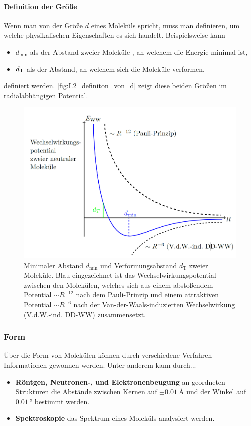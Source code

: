     \paragraph{Definition der Größe} Wenn man von der Größe $d$ eines Moleküls spricht, muss man definieren, um welche physikalischen Eigenschaften es sich handelt. Beispielsweise kann \begin{itemize}
        \item $d_\text{min}$ als der Abstand zweier Moleküle , an welchem die Energie minimal ist,
        \item $d_\text T$ als der Abstand, an welchem sich die Moleküle verformen,
    \end{itemize} 
    definiert werden. \autoref{fig:I.2_definiton_von_d} zeigt diese beiden Größen im radialabhängigen Potential. 
    
    \begin{figure}[H]
        \centering
        \includegraphics[width=0.8\linewidth]{figures/vl01/definition_von_d.png}
        \caption{Minimaler Abstand $d_\text{min}$ und Verformungsabstand $d_\text{T}$ zweier Moleküle. Blau eingezeichnet ist das Wechselwirkungspotential zwischen den Molekülen, welches sich aus einem abstoßendem Potential $\sim R^{-12}$ nach dem Pauli-Prinzip und einem attraktiven Potential $\sim R^{-6}$ nach der Van-der-Waals-induzierten Wechselwirkung (V.d.W.-ind. DD-WW) zusammensetzt.}
        \label{fig:I.2_definiton_von_d}
    \end{figure}
    
    
    \subsubsection{Form}
        Über die Form von Molekülen können durch verschiedene Verfahren Informationen gewonnen werden. Unter anderem kann durch...
        \begin{itemize}
        	\item \textbf{Röntgen, Neutronen-, und Elektronenbeugung} an geordneten Strukturen die Abstände zwischen Kernen auf $\pm\SI{0,01}{\angstrom}$ und der Winkel auf $\SI{0,01}{\degree}$ bestimmt werden.
        	\item \textbf{Spektroskopie} das Spektrum eines Moleküls analysiert werden.
        \end{itemize}
    
